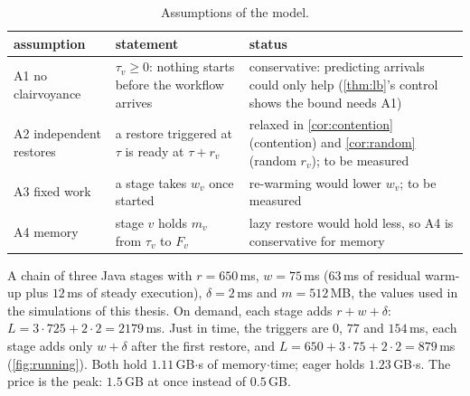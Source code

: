\begin{table}[htbp]
\centering
\caption{Assumptions of the model.}
\label{tab:assumptions}
\small
\begin{tabular}{@{}p{}p{}p{}@{}}
\toprule
assumption & statement & status \\
\midrule
A1 no clairvoyance & $\tau_v \ge 0$: nothing starts before the workflow arrives &
  conservative: predicting arrivals could only help (\cref{thm:lb}'s control shows the bound
  needs A1) \\
A2 independent restores & a restore triggered at $\tau$ is ready at $\tau + r_v$ &
  relaxed in \cref{cor:contention} (contention) and \cref{cor:random} (random $r_v$); to be
  measured \\
A3 fixed work & a stage takes $w_v$ once started & re-warming would lower $w_v$; to be measured \\
A4 memory & stage $v$ holds $m_v$ from $\tau_v$ to $F_v$ & lazy restore would hold less, so A4
  is conservative for memory \\
\bottomrule
\end{tabular}
\end{table}

\begin{example}
\label{ex:running}
A chain of three Java stages with $r = 650$\,ms, $w = 75$\,ms ($63$\,ms of residual warm-up
plus $12$\,ms of steady execution), $\delta = 2$\,ms and $m = 512$\,MB, the values used in the
simulations of this thesis. On demand, each stage adds $r + w + \delta$:
$L = 3 \cdot 725 + 2 \cdot 2 = 2179$\,ms. Just in time, the triggers are $0$, $77$ and $154$\,ms,
each stage adds only $w + \delta$ after the first restore, and $L = 650 + 3 \cdot 75 + 2 \cdot 2
= 879$\,ms (\cref{fig:running}). Both hold $1.11$\,GB$\cdot$s of memory$\cdot$time; eager holds
$1.23$\,GB$\cdot$s. The price is the peak: $1.5$\,GB at once instead of $0.5$\,GB.
\end{example}

